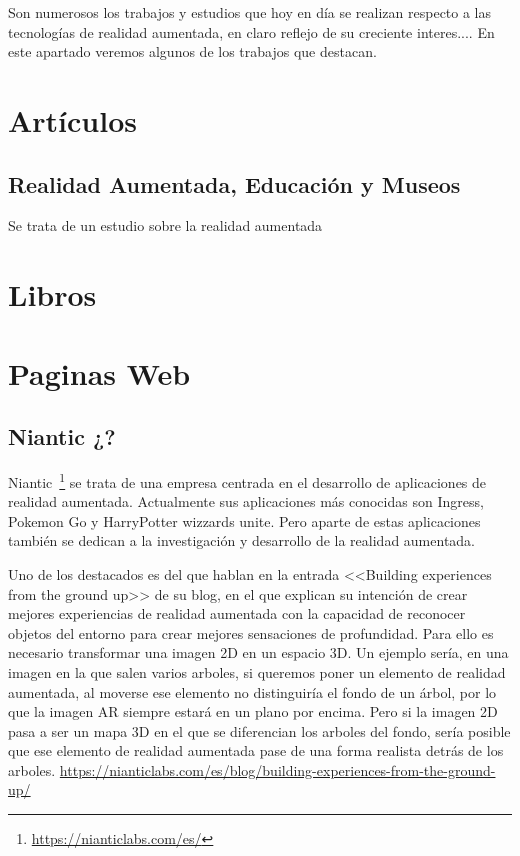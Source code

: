 
Son numerosos los trabajos y estudios que hoy en día se realizan respecto a las tecnologías de realidad aumentada, en claro reflejo de su creciente interes....  En este apartado veremos algunos de los trabajos que destacan.

\section{Artículos}
\subsection{Realidad Aumentada, Educación y Museos}
 
 Se trata de un estudio sobre la realidad aumentada

\section{Libros}

\section{Paginas Web}


\subsection{Niantic ¿?}
Niantic~\footnote{\url{https://nianticlabs.com/es/}} se trata de una empresa centrada en el desarrollo de aplicaciones de realidad aumentada. Actualmente sus aplicaciones más conocidas son Ingress, Pokemon Go y HarryPotter wizzards unite.
Pero aparte de estas aplicaciones también se dedican a la investigación y desarrollo de la realidad aumentada.

Uno de los destacados es del que hablan en la entrada <<Building experiences from the ground up>> de su blog, en el que explican su intención de crear mejores experiencias de realidad aumentada con
la capacidad de reconocer objetos del entorno para crear mejores sensaciones de profundidad. Para ello es necesario transformar una imagen 2D en un espacio 3D. Un ejemplo sería, en una imagen en la que salen varios arboles, si queremos poner un elemento de realidad aumentada, al moverse ese elemento no distinguiría el fondo de un árbol, por lo que la imagen AR siempre estará en un plano por encima. Pero si la imagen 2D pasa a ser un mapa 3D en el que se diferencian los arboles del fondo, sería posible que ese elemento de realidad aumentada pase de una forma realista detrás de los arboles. 
\url{https://nianticlabs.com/es/blog/building-experiences-from-the-ground-up/}